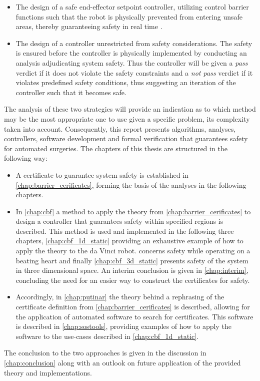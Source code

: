 \vspace{-2mm}
\begin{itemize}
\item The design of a safe end-effector setpoint controller, utilizing control barrier functions such that the robot is physically prevented from entering unsafe areas, thereby guaranteeing safety in real time \citep{bib:safety}. 
\item The design of a controller unrestricted from safety considerations. The safety is ensured before the controller is physically implemented by conducting an analysis adjudicating system safety. Thus the controller will be given a \textit{pass} verdict if it does not violate the safety constraints and a \textit{not pass} verdict if it violates predefined safety conditions, thus suggesting an iteration of the controller such that it becomes safe. 
\end{itemize}
The analysis of these two strategies will provide an indication as to which method may be the most appropriate one to use given a specific problem, its complexity taken into account. Consequently, this report presents algorithms, analyses, controllers, software development and formal verification that guarantees safety for automated surgeries.
The chapters of this thesis are structured in the following way:
\begin{itemize}
\item A certificate to guarantee system safety is established in \autoref{chap:barrier_cerificates}, forming the basis of the analyses in the following chapters.

\item In \autoref{chap:cbf} a method to apply the theory from \autoref{chap:barrier_cerificates} to design a controller that guarantees safety within specified regions is described. This method is used and implemented in the following three chapters, \autoref{chap:cbf_1d_static} providing an exhaustive example of how to apply the theory to the da Vinci robot.  concerns safety while operating on a beating heart and finally \autoref{chap:cbf_3d_static}  presents safety of the system in three dimensional space. An interim conclusion is given in \autoref{chap:interim}, concluding the need for an easier way to construct the certificates for safety.

\item  Accordingly, in \autoref{chap:putinar} the theory behind a rephrasing of the certificate definition from \autoref{chap:barrier_cerificates} is described, allowing for the application of automated software to search for certificates. This software is described  in \autoref{chap:sostools}, providing examples of how to apply the software to the use-cases described in \autoref{chap:cbf_1d_static}.
\end{itemize}
The conclusion to the two approaches is given in the discussion in \autoref{chap:conclusion} along with an outlook on future application of the provided theory and implementations.



